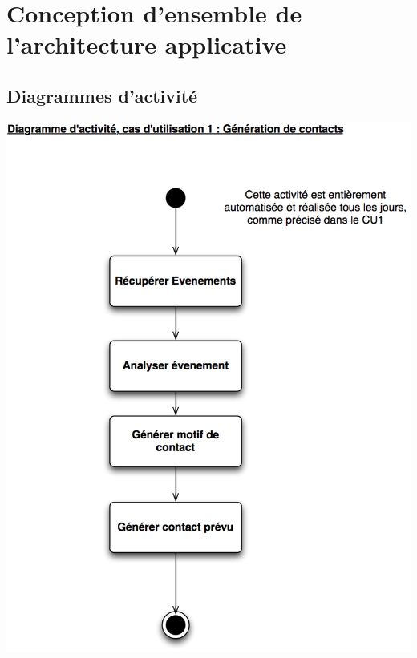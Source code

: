 
\section{Conception d'ensemble de l'architecture applicative}

\subsection{Diagrammes d'activité}

\begin {center}
\includegraphics[width=\textwidth]{../../diagrammeActivite/DACU1.png}

\end{center}
